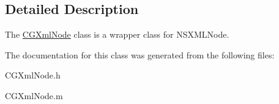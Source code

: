 \subsection{Detailed Description}
The \hyperlink{interface_c_g_xml_node}{C\-G\-Xml\-Node} class is a wrapper class for N\-S\-X\-M\-L\-Node. 

The documentation for this class was generated from the following files\-:\begin{DoxyCompactItemize}
\item 
C\-G\-Xml\-Node.\-h\item 
C\-G\-Xml\-Node.\-m\end{DoxyCompactItemize}
